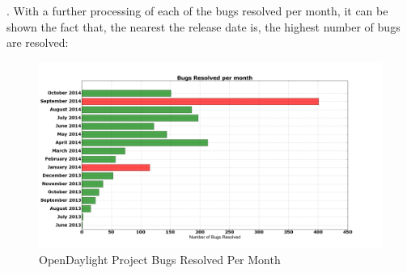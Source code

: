 \documentclass[a4paper, 12pt]{book}
\begin{document}
{\begin{verbatim}
\end{verbatim}
.
With a further processing of each of the bugs resolved per month, it can be shown the fact that, the nearest the release date is, the highest number of bugs are resolved:
\begin{center}
 \begin{figure}[H]
 \begin{center}
   \includegraphics[width=17cm]{img/bugs_resolved_month_01.png}
   \caption{OpenDaylight Project Bugs Resolved Per Month}
   \label{fig:odl_bugs_resolved_month}
 \end{center}
 \end{figure}
\end{center}

}
\end{document}
